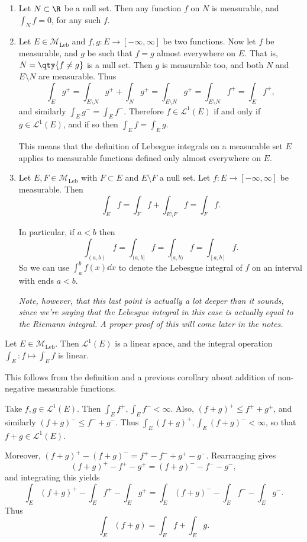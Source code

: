 \documentclass{maths}
\newcommand{\mleb}{\mathcal{M}_{\text{Leb}}}
\begin{document}
\begin{enumerate}
    \item Let $N\subset\R$ be a null set.
    Then any function $f$ on $N$ is measurable, and $\int_N f=0$, for any such $f$.
    \item Let $E\in\mleb$ and $f,g\colon E\to[-\infty,\infty]$ be two functions.
    Now let $f$ be measurable, and $g$ be such that $f=g$ almost everywhere on $E$.
    That is, $N=\qty{f\neq g}$ is a null set.
    Then $g$ is measurable too, and both $N$ and $E\setminus N$ are measurable.
    Thus
    \[
        \int_E g^+ =
        \int_{E\setminus N} g^+ + \int_N g^+ =
        \int_{E\setminus N} g^+ =
        \int_{E\setminus N} f^+ =
        \int_E f^+,
    \]
    and similarly $\int_E g^- = \int_E f^-$.
    Therefore $f\in \mathcal{L}^1(E)$ if and only if $g\in \mathcal{L}^1(E)$, and if so then $\int_E f = \int_E g$.

    This means that the definition of Lebesgue integrals on a measurable set $E$ applies to measurable functions defined only almost everywhere on $E$.
    \item Let $E,F\in\mleb$ with $F\subset E$ and $E\setminus F$ a null set.
    Let $f\colon E\to[-\infty,\infty]$ be measurable.
    Then
    \[
        \int_E f =
        \int_F f + \int_{E\setminus F} f =
        \int_F f.
    \]

    In particular, if $a<b$ then
    \[
        \int_{(a,b)} f =
        \int_{(a,b]} f =
        \int_{[a,b)} f =
        \int_{[a,b]} f.
    \]
    So we can use $\int_a^b f(x)\dd{x}$ to denote the Lebesgue integral of $f$ on an interval with ends $a<b$.

    \emph{Note, however, that this last point is actually a lot deeper than it sounds, since we're saying that the Lebesgue integral in this case is actually equal to the Riemann integral.
    A proper proof of this will come later in the notes.}
\end{enumerate}

\begin{thm}
    Let $E\in\mleb$.
    Then $\mathcal{L}^1(E)$ is a linear space, and the integral operation $\int_E\colon f\mapsto \int_E f$ is linear.
\end{thm}

\begin{prf}
    This follows from the definition and a previous corollary about addition of non-negative measurable functions.

    Take $f,g\in \mathcal{L}^1(E)$.
    Then $\int_E f^+,\int_E f^- < \infty$.
    Also, $(f+g)^+\leqslant f^+ + g^+$, and similarly $(f+g)^-\leqslant f^- + g^-$.
    Thus $\int_E(f+g)^+,\int_E(f+g)^- < \infty$, so that $f+g\in \mathcal{L}^1(E)$.

    Moreover, $(f+g)^+ - (f+g)^- = f^+ - f^- + g^+ - g^-$.
    Rearranging gives
    \[
        (f+g)^+ - f^+ - g^+ =
        (f+g)^-  - f^- - g^-,
    \]
    and integrating this yields
    \[
        \int_E (f+g)^+ - \int_E f^+ - \int_E g^+ =
        \int_E (f+g)^-  - \int_E f^- - \int_E g^-.
    \]
    Thus
    \[
        \int_E (f+g) =
        \int_E f + \int_E g.
    \]
\end{prf}
\end{document}
